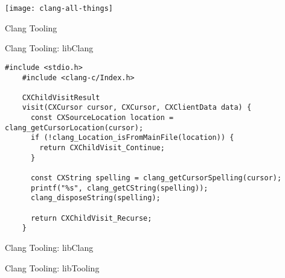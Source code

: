 
\begin{slide}{}
  \texttt{[image: clang-all-things]}
\end{slide}

\begin{slide}{Clang Tooling}\end{slide}

\begin{frame}[fragile]{Clang Tooling: libClang}
  \begin{lstlisting}[basicstyle=\ttfamily\scriptsize]
    #include <stdio.h>
    #include <clang-c/Index.h>

    CXChildVisitResult
    visit(CXCursor cursor, CXCursor, CXClientData data) {
      const CXSourceLocation location = clang_getCursorLocation(cursor);
      if (!clang_Location_isFromMainFile(location)) {
        return CXChildVisit_Continue;
      }

      const CXString spelling = clang_getCursorSpelling(cursor);
      printf("%s", clang_getCString(spelling));
      clang_disposeString(spelling);

      return CXChildVisit_Recurse;
    }
  \end{lstlisting}
\end{frame}

\begin{frame}[fragile]{Clang Tooling: libClang}
\end{frame}


\begin{slide}{Clang Tooling: libTooling}
  \vspace{0.2cm}


  \vspace{0.9cm}


  \vspace{0.2cm}


  \vspace{0.7cm}

  \vspace{0.2cm}

\end{slide}


